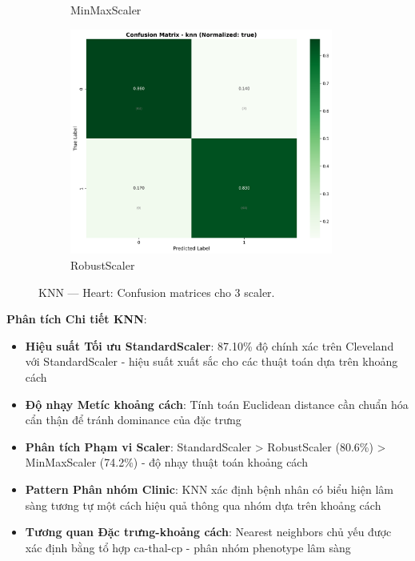\begin{figure}[H]
\begin{subfigure}[b]{0.31\textwidth}
\caption{MinMaxScaler}\label{fig:knn_heart_cm_minmax}
\end{subfigure}\hfill
\begin{subfigure}[b]{0.31\textwidth}\centering
\includegraphics[width=0.95\textwidth]{Result/heart_dataset/confusion_matrices/knn_numeric_dataset_RobustScaler.png}
\caption{RobustScaler}\label{fig:knn_heart_cm_robust}
\end{subfigure}
\caption{KNN — Heart: Confusion matrices cho 3 scaler.}
\label{fig:knn_heart_confusions}
\end{figure}

\textbf{Phân tích Chi tiết KNN}:
\begin{itemize}
    \item \textbf{Hiệu suất Tối ưu StandardScaler}: 87.10\% độ chính xác trên Cleveland với StandardScaler - hiệu suất xuất sắc cho các thuật toán dựa trên khoảng cách
    \item \textbf{Độ nhạy Metíc khoảng cách}: Tính toán Euclidean distance cần chuẩn hóa cẩn thận để tránh dominance của đặc trưng
    \item \textbf{Phân tích Phạm vi Scaler}: StandardScaler > RobustScaler (80.6\%) > MinMaxScaler (74.2\%) - độ nhạy thuật toán khoảng cách
    \item \textbf{Pattern Phân nhóm Clinic}: KNN xác định bệnh nhân có biểu hiện lâm sàng tương tự một cách hiệu quả thông qua nhóm dựa trên khoảng cách
    \item \textbf{Tương quan Đặc trưng-khoảng cách}: Nearest neighbors chủ yếu được xác định bằng tổ hợp ca-thal-cp - phân nhóm phenotype lâm sàng
\end{itemize}

